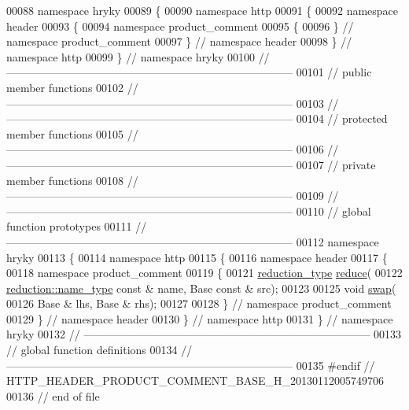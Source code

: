\begin{DoxyCode}
00088 \textcolor{keyword}{namespace }hryky
00089 \{
00090 \textcolor{keyword}{namespace }http
00091 \{
00092 \textcolor{keyword}{namespace }header
00093 \{
00094 \textcolor{keyword}{namespace }product\_comment
00095 \{
00096 \} \textcolor{comment}{// namespace product\_comment}
00097 \} \textcolor{comment}{// namespace header}
00098 \} \textcolor{comment}{// namespace http}
00099 \} \textcolor{comment}{// namespace hryky}
00100 \textcolor{comment}{//
      ------------------------------------------------------------------------------}
00101 \textcolor{comment}{// public member functions}
00102 \textcolor{comment}{//
      ------------------------------------------------------------------------------}
00103 \textcolor{comment}{//
      ------------------------------------------------------------------------------}
00104 \textcolor{comment}{// protected member functions}
00105 \textcolor{comment}{//
      ------------------------------------------------------------------------------}
00106 \textcolor{comment}{//
      ------------------------------------------------------------------------------}
00107 \textcolor{comment}{// private member functions}
00108 \textcolor{comment}{//
      ------------------------------------------------------------------------------}
00109 \textcolor{comment}{//
      ------------------------------------------------------------------------------}
00110 \textcolor{comment}{// global function prototypes}
00111 \textcolor{comment}{//
      ------------------------------------------------------------------------------}
00112 \textcolor{keyword}{namespace }hryky
00113 \{
00114 \textcolor{keyword}{namespace }http
00115 \{
00116 \textcolor{keyword}{namespace }header
00117 \{
00118 \textcolor{keyword}{namespace }product\_comment
00119 \{
00121     \hyperlink{namespacehryky_a343a9a4c36a586be5c2693156200eadc}{reduction_type} \hyperlink{namespacehryky_1_1http_a08fc36a78a8e2908140fcd102829a566}{reduce}(
00122         \hyperlink{namespacehryky_1_1reduction_ac686c30a4c8d196bbd0f05629a6b921f}{reduction::name_type} \textcolor{keyword}{const} & name, Base \textcolor{keyword}{const} & src);
00123 
00125     \textcolor{keywordtype}{void} \hyperlink{namespacehryky_1_1http_a38e62595ad532d18fbc65ceb61973aec}{swap}(
00126         Base & lhs, Base & rhs);
00127 
00128 \} \textcolor{comment}{// namespace product\_comment}
00129 \} \textcolor{comment}{// namespace header}
00130 \} \textcolor{comment}{// namespace http}
00131 \} \textcolor{comment}{// namespace hryky}
00132 \textcolor{comment}{//
      ------------------------------------------------------------------------------}
00133 \textcolor{comment}{// global function definitions}
00134 \textcolor{comment}{//
      ------------------------------------------------------------------------------}
00135 \textcolor{preprocessor}{#endif // HTTP\_HEADER\_PRODUCT\_COMMENT\_BASE\_H\_20130112005749706}
00136 \textcolor{preprocessor}{}\textcolor{comment}{// end of file}
\end{DoxyCode}
